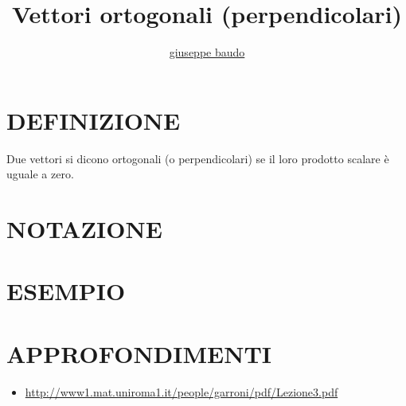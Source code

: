 \documentclass[a4paper,10pt]{article}
\title{Vettori ortogonali (perpendicolari)}
\author{\href{http://www.baudo.hol.es}{giuseppe baudo}}
\begin{document}
\maketitle

\section{DEFINIZIONE}
Due vettori si dicono ortogonali (o perpendicolari) se il loro prodotto scalare è uguale a zero.

\section{NOTAZIONE}

\section{ESEMPIO}

\section{APPROFONDIMENTI}
\begin{itemize}
 \item \href{http://www1.mat.uniroma1.it/people/garroni/pdf/Lezione3.pdf}{http://www1.mat.uniroma1.it/people/garroni/pdf/Lezione3.pdf}
\end{itemize}
\end{document}
